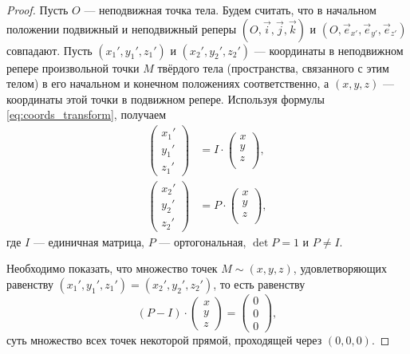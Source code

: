 \begin{proof}
  Пусть $O$ --- неподвижная точка тела. Будем считать, что в начальном положении
  подвижный и неподвижный реперы $(O, \vec{i}, \vec{j}, \vec{k})$ и $(O,
  \vec{e}_{x'}, \vec{e}_{y'}, \vec{e}_{z'})$ совпадают. Пусть $(x_1', y_1',
  z_1')$ и $(x_2', y_2', z_2')$ --- координаты в неподвижном репере произвольной
  точки $M$ твёрдого тела (пространства, связанного с этим телом) в его
  начальном и конечном положениях соответственно, а $(x,y,z)$ --- координаты
  этой точки в подвижном репере. Используя формулы \ref{eq:coords_transform},
  получаем
  \begin{equation*}
    \begin{aligned}
      \left(
      \begin{array}{c}
        x_1' \\
        y_1' \\
        z_1'
      \end{array}
      \right)
      &= I \cdot \left(
      \begin{array}{c}
        x \\
        y \\
        z \\
      \end{array}
      \right), \\
      \left(
      \begin{array}{c}
        x_2' \\
        y_2' \\
        z_2'
      \end{array}
      \right)
      &= P \cdot \left(
      \begin{array}{c}
        x \\
        y \\
        z \\
      \end{array}
      \right),
    \end{aligned}
  \end{equation*}
  где $I$ --- единичная матрица, $P$ --- ортогональная, $\det P = 1$ и
  $P \neq I$.

  Необходимо показать, что множество точек $M \sim (x,y,z)$, удовлетворяющих
  равенству $(x_1', y_1', z_1') = (x_2', y_2', z_2')$, то есть равенству
  \begin{equation*}
    (P - I) \cdot \left(
    \begin{array}{c}
      x \\
      y \\
      z
    \end{array}
    \right) = \left(
    \begin{array}{c}
      0 \\
      0 \\
      0
    \end{array}
    \right),
  \end{equation*}
  суть множество всех точек некоторой прямой, проходящей через $(0,0,0)$.


\end{proof}
